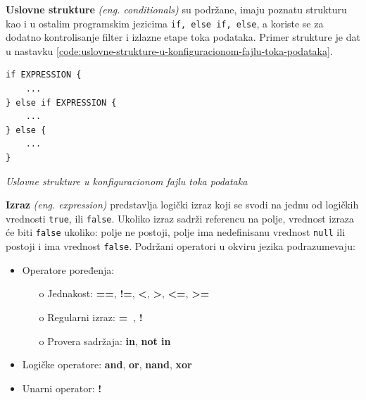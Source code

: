 \par
\textbf{Uslovne strukture} \textit{(eng. conditionals)} su podržane, imaju poznatu strukturu kao i u ostalim programskim jezicima \texttt{if, else if, else}, a koriste se za dodatno kontrolisanje filter i izlazne etape toka podataka. Primer strukture je dat u nastavku \ref{code:uslovne-strukture-u-konfiguracionom-fajlu-toka-podataka}.
\begin{listing}[H]
\begin{verbatim}
if EXPRESSION {
    ...
} else if EXPRESSION {
    ...
} else {
    ...
}
\end{verbatim}
\caption{\textit{Uslovne strukture u konfiguracionom fajlu toka podataka}}
\label{code:uslovne-strukture-u-konfiguracionom-fajlu-toka-podataka}
\end{listing}

\par
\textbf{Izraz} \textit{(eng. expression)} predstavlja logički izraz koji se svodi na jednu od logičkih vrednosti \texttt{true}, ili \texttt{false}. Ukoliko izraz sadrži referencu na polje, vrednost izraza će biti \texttt{false} ukoliko: polje ne postoji, polje ima nedefinisanu vrednost \texttt{null} ili postoji i ima vrednost \texttt{false}. Podržani operatori u okviru jezika podrazumevaju:
\begin{itemize}
\item Operatore poređenja:
\begin{itemize}
\item[o] Jednakost: \textbf{==}, \textbf{!=}, \textbf{<}, \textbf{>}, \textbf{<=}, \textbf{>=}
\item[o] Regularni izraz: \textbf{=~}, \textbf{!~}
\item[o] Provera sadržaja: \textbf{in}, \textbf{not in}
\end{itemize}
\item Logičke operatore: \textbf{and}, \textbf{or}, \textbf{nand}, \textbf{xor}
\item Unarni operator: \textbf{!}
\end{itemize}

